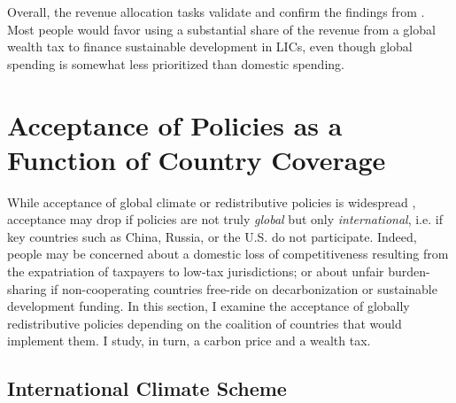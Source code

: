 \documentclass[12pt,english]{article}
\begin{document}
\begin{bibunit}
Overall, the revenue allocation tasks validate and confirm the findings from \cite{fabre_majority_2025}. Most people would favor using a substantial share of the revenue from a global wealth tax to finance sustainable development in LICs, even though global spending is somewhat less prioritized than domestic spending. 


\section{Acceptance of %
Policies as a Function of Country Coverage\label{sec:coverage}}

While acceptance of global climate or redistributive policies is widespread \citep{fabre_majority_2025,cappelen_majority_2025}, acceptance may drop if policies are not truly \textit{global} but only \textit{international}, i.e. if key countries such as China, Russia, or the U.S. do not participate. Indeed, people may be concerned about a domestic loss of competitiveness resulting from the expatriation of taxpayers to low-tax jurisdictions; or about unfair burden-sharing if non-cooperating countries free-ride on decarbonization or sustainable development funding. %
In this section, I examine the acceptance of globally redistributive policies depending on the coalition of countries that would implement them. I study, in turn, a carbon price and a wealth tax.

\subsection{International Climate Scheme}\label{subsec:ics}



\end{bibunit}
\end{document}
